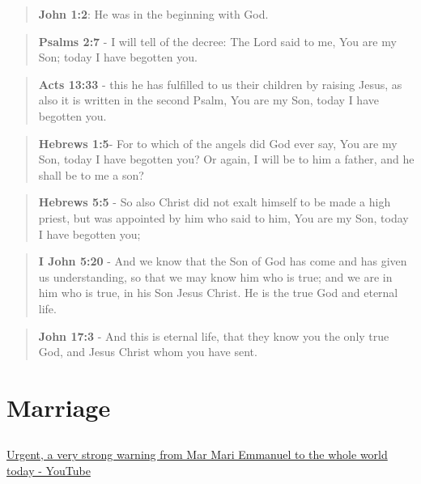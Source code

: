 \documentclass[11pt]{article}
\begin{document}
\begin{quote}
\textbf{John 1:2}: He was in the beginning with God.
\end{quote}

\begin{quote}
\textbf{Psalms 2:7} - I will tell of the decree: The Lord said to me, You are my Son; today I have begotten you.
\end{quote}

\begin{quote}
\textbf{Acts 13:33} - this he has fulfilled to us their children by raising Jesus, as also it is written in the second Psalm, You are my Son, today I have begotten you.
\end{quote}

\begin{quote}
\textbf{Hebrews 1:5}- For to which of the angels did God ever say, You are my Son, today I have begotten you? Or again, I will be to him a father, and he shall be to me a son?
\end{quote}

\begin{quote}
\textbf{Hebrews 5:5} - So also Christ did not exalt himself to be made a high priest, but was appointed by him who said to him, You are my Son, today I have begotten you;
\end{quote}

\begin{quote}
\textbf{I John 5:20} - And we know that the Son of God has come and has given us understanding, so that we may know him who is true; and we are in him who is true, in his Son Jesus Christ. He is the true God and eternal life.
\end{quote}

\begin{quote}
\textbf{John 17:3} - And this is eternal life, that they know you the only true God, and Jesus Christ whom you have sent.
\end{quote}

\section{Marriage}
\label{sec:org4f9d83d}
\subsection{}
\label{sec:org599d6d7}
\href{https://youtu.be/o4\_OXvDnqDE?t=1271}{Urgent, a very strong warning from Mar Mari Emmanuel to the whole world today - YouTube}
\end{document}
